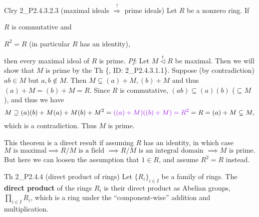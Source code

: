 \documentclass{article}
\newcommand{\nles}{\vartriangleleft}
\newcommand{\ideal}{\overset{\text{r}}{\nles}} %
\begin{document}
\begin{Th}{Clry 2\_P2.4.3.2.3 (maximal ideals $\overset{?}{\Longrightarrow}$ prime ideals)}
    Let $R$ be a nonzero ring. If
    \begin{compactenum}
        \item $R$ is commutative and
        \item $R^2 = R$ (in particular $R$ has an identity),
    \end{compactenum}
    then every maximal ideal of $R$ is prime.
    \tcblower
    \textit{Pf}: Let $M\ideal R$ be maximal. Then we will show that $M$ is prime by the Th \{, ID: 2\_P2.4.3.1.1\}. Suppose (by contradiction) $ab\in M$ but $a, b\notin M$. Then $M\subsetneq (a)+M, (b)+M$ and thus $(a)+M = (b)+M = R$. Since $R$ is commutative, $(ab)\subseteq (a)(b)$ ($\subseteq M$), and thus we have
    $$ M\supseteq (a)(b) + M(a) + M(b) + M^2 = \textcolor{P}{((a) + M)((b) + M) = R^2} = R = (a)+M\subsetneq M, $$
    which is a contradiction. Thus $M$ is prime.
\end{Th}

\begin{Rmk}{}
    This theorem is a direct result if assuming $R$ has an identity, in which case 
    $$ M \text{ is maximal} \implies R/M \text{ is a field } \implies R/M \text{ is an integral domain } \implies M \text{ is prime}. $$
    But here we can loosen the assumption that $1\in R$, and assume $R^2 = R$ instead.
\end{Rmk}

\begin{Df}{Th 2\_P2.4.4 (direct product of rings)}
    Let $\{R_i\}_{i\in I}$ be a family of rings. The \textbf{direct product} of the rings $R_i$ is their direct product as Abelian groups, $\prod_{i\in I} R_i$, \textcolor{Th}{which is a ring under the ``component-wise'' addition and multiplication.} 
\end{Df}
\end{document}
